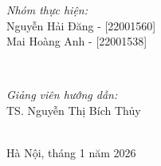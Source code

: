 \begin{titlepage}
\begin{minipage}{0.4\textwidth}
\begin{flushleft} \large
\emph{Nhóm thực hiện:} \\
Nguyễn Hải Đăng - [22001560]\\ 
Mai Hoàng Anh - [22001538]
\end{flushleft}
\end{minipage}
~
\begin{minipage}{0.4\textwidth}
\begin{flushright} \large
\emph{Giảng viên hướng dẫn:} \\
TS. Nguyễn Thị Bích Thủy
\end{flushright}
\end{minipage}\\[0.5cm]

\vfill
{\large Hà Nội, tháng 1 năm 2026}

\end{titlepage}
